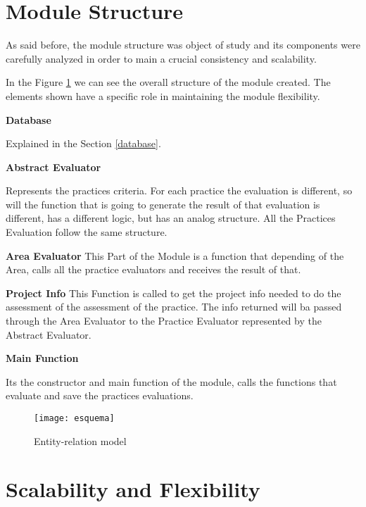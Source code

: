 \section{Module Structure}

As said before, the module structure was object of study and its components were carefully analyzed in order to main a crucial consistency and scalability.

In the Figure \ref{fig:esquema} we can see the overall structure of the module created. The elements shown have a specific role in maintaining the module flexibility. 

\textbf{Database}

Explained in the Section \ref{database}.

\textbf{Abstract Evaluator}

Represents the practices criteria. For each practice the evaluation is different, so will the function that is going to generate the result of that evaluation is different, has a different logic, but has an analog structure. All the Practices Evaluation follow the same structure.

\textbf{Area Evaluator}
This Part of the Module is a function that depending of the Area, calls all the practice evaluators and receives the result of that.


\textbf{Project Info}
This Function is called to get the project info needed to do the assessment of the assessment of the practice. The info returned will ba passed through the Area Evaluator to the Practice Evaluator represented by the Abstract Evaluator.

\textbf{Main Function}

Its the constructor and main function of the module, calls the functions that evaluate and save the practices evaluations.

\begin{landscape}
\begin{figure}[f]
	\begin{center}
		\leavevmode
		\texttt{[image: esquema]}
		\caption{Entity-relation model}
		\label{fig:esquema}
	\end{center}
\end{figure}
\end{landscape}

\section{Scalability and Flexibility}

